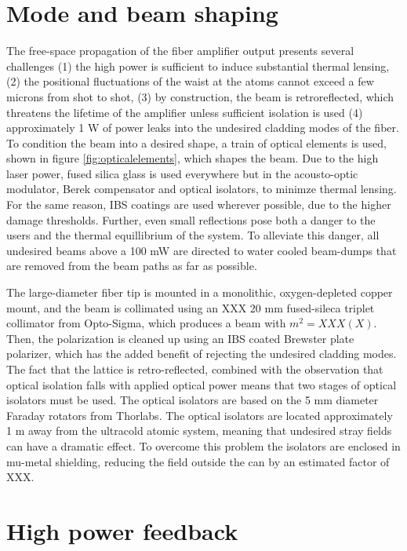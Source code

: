 \documentclass[twocolumn,aps,pra,showpacs,preprintnumbers,bibnotes]{revtex4-1}
\begin{document}
\section{Mode and beam shaping}
The free-space propagation of the fiber amplifier output presents several challenges (1) the high power is sufficient to induce substantial thermal lensing, (2) the positional fluctuations of the waist at the atoms cannot exceed 
a few microns from shot to shot, (3) by construction, the beam is retroreflected, which threatens the lifetime of the amplifier unless sufficient isolation is used (4) approximately 1 W of power leaks into the undesired cladding modes of the fiber. 
To condition the beam into a desired shape, a train of optical elements is used, shown in figure \ref{fig:opticalelements}, which shapes the beam. 
Due to the high laser power, fused silica glass is used everywhere but in the acousto-optic modulator, Berek compensator and optical isolators, to minimze thermal lensing.
For the same reason, IBS coatings are used wherever possible, due to the higher damage thresholds.
Further, even small reflections pose both a danger to the users and the thermal equillibrium of the system.
To alleviate this danger, all undesired beams above a 100 mW are directed to water cooled beam-dumps that are removed from the beam paths as far as possible.

The large-diameter fiber tip is mounted in a monolithic, oxygen-depleted copper mount, and the beam is collimated using an XXX 20 mm fused-sileca triplet collimator from Opto-Sigma, which produces a beam with $m^2 = XXX(X)$.
Then, the polarization is cleaned up using an IBS coated Brewster plate polarizer, which has the added benefit of rejecting the undesired cladding modes. 
The fact that the lattice is retro-reflected, combined with the observation that optical isolation falls with applied optical power\cite{LIGO} means that two stages of optical isolators must be used. The optical isolators are based on the 5 mm diameter Faraday rotators from Thorlabs. 
The optical isolators are located approximately 1 m away from the ultracold atomic system, meaning that undesired stray fields can have a dramatic effect.
To overcome this problem the isolators are enclosed in mu-metal shielding, reducing the field outside the can by an estimated factor of XXX.

\section{High power feedback}
\end{document}
